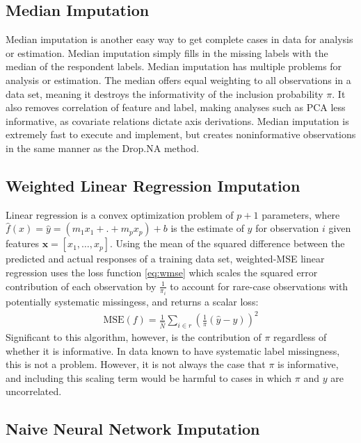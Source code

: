 \documentclass[12pt,twoside]{reedthesis}
\begin{document}
\subsection{Median Imputation}\label{median-imputation}

Median imputation is another easy way to get complete cases in data for
analysis or estimation. Median imputation simply fills in the missing
labels with the median of the respondent labels. Median imputation has
multiple problems for analysis or estimation. The median offers equal
weighting to all observations in a data set, meaning it destroys the
informativity of the inclusion probability \(\pi\). It also removes
correlation of feature and label, making analyses such as PCA less
informative, as covariate relations dictate axis derivations. Median
imputation is extremely fast to execute and implement, but creates
noninformative observations in the same manner as the Drop.NA method.

\subsection{Weighted Linear Regression Imputation}\label{sec:linear_reg}

Linear regression is a convex optimization problem of \(p+1\)
parameters, where \(\hat f(x) = \hat y = (m_1x_1 + .+ m_px_p)+b\) is the
estimate of \(y\) for observation \(i\) given features
\(\boldsymbol{x} = [x_1, \dots ,x_p]\). Using the mean of the squared
difference between the predicted and actual responses of a training data
set, weighted-MSE linear regression uses the loss function \eqref{eq:wmse}
which scales the squared error contribution of each observation by
\(\frac{1}{\pi_i}\) to account for rare-case observations with
potentially systematic missingess, and returns a scalar loss:
\begin{align}
\text{MSE}(f) = \frac{1}{\hat N} \sum_{i \in r} (\frac{1}{\pi}(\hat{y} - y))^2 \label{eq:wmse}
\end{align}
Significant to this algorithm, however, is the contribution of \(\pi\)
regardless of whether it is informative. In data known to have
systematic label missingness, this is not a problem. However, it is not
always the case that \(\pi\) is informative, and including this scaling
term would be harmful to cases in which \(\pi\) and \(y\) are
uncorrelated.

\subsection{Naive Neural Network
Imputation}\label{naive-neural-network-imputation}
\end{document}
